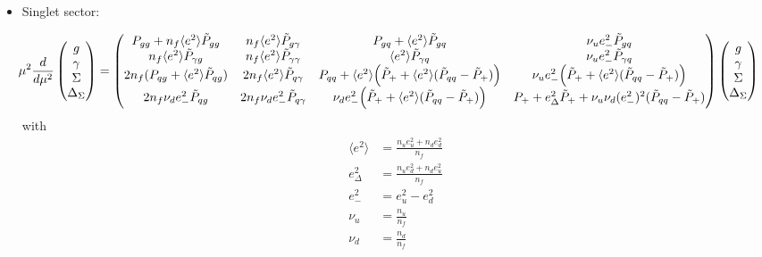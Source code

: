 \documentclass[a4paper,twoside]{article}
\begin{document}
\begin{itemize}
\item Singlet sector:

\begin{equation*}
\hspace*{-0.4cm}\mu^2\frac{d}{d\mu^2}
\begin{pmatrix}
g \\
\gamma \\
\Sigma \\
\Delta_\Sigma
\end{pmatrix}
=
\begin{pmatrix}
 P_{gg}+n_f \langle e^2\rangle \tilde{P}_{gg} & n_f \langle e^2\rangle \tilde{P}_{g\gamma} & P_{gq} + \langle e^2\rangle \tilde{P}_{gq} & \nu_ue^2_-\tilde{P}_{gq} \\
 n_f \langle e^2\rangle \tilde{P}_{\gamma g} & n_f \langle e^2\rangle \tilde{P}_{\gamma \gamma} & \langle e^2\rangle \tilde{P}_{\gamma q} & \nu_ue^2_-\tilde{P}_{\gamma q} \\
 2n_f (P_{qg} +\langle e^2\rangle  \tilde{P}_{qg} )& 2 n_f \langle e^2\rangle  \tilde{P}_{q\gamma} & P_{qq}+ \langle e^2\rangle \Bigl(\tilde{P}_{+} + \langle e^2\rangle(\tilde{P}_{qq}-\tilde{P}_{+})\Bigr) & \nu_ue^2_-\Bigl(\tilde{P}_{+}+ \langle e^2\rangle (\tilde{P}_{qq}-\tilde{P}_{+}) \Bigr)\\
 2n_f \nu_d e^2_-\tilde{P}_{qg} & 2n_f \nu_d e^2_-\tilde{P}_{q\gamma} & \nu_de^2_-\Bigl( \tilde{P}_{+} +  \langle e^2\rangle (\tilde{P}_{qq}-\tilde{P}_{+}) \Bigr)& P_+ +e_\Delta^2 \tilde{P}_{+} +\nu_u \nu_d (e^2_-)^2(\tilde{P}_{qq}-\tilde{P}_{+})
\end{pmatrix}
\begin{pmatrix}
g \\
\gamma \\
\Sigma \\
\Delta_\Sigma
\end{pmatrix}
\end{equation*}
with
\begin{align*}
 \langle e^2\rangle&=\frac{n_u e_u^2+n_d e_d^2}{n_f} \\
e_\Delta^2&=\frac{n_u e_d^2+n_d e_u^2}{n_f} \\
e^2_-&= e_u^2 -e_d^2 \\
\nu_u &= \frac{n_u}{n_f}\\
\nu_d &= \frac{n_d}{n_f}
\end{align*}


\end{itemize}
\end{document}
